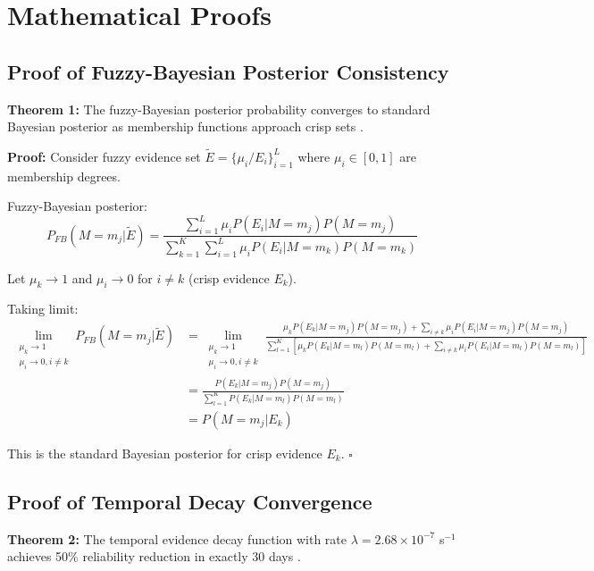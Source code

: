 
\section{Mathematical Proofs}

\subsection{Proof of Fuzzy-Bayesian Posterior Consistency}

\textbf{Theorem 1:} The fuzzy-Bayesian posterior probability converges to standard Bayesian posterior as membership functions approach crisp sets \cite{dubois1988possibility}.

\textbf{Proof:}
Consider fuzzy evidence set $\tilde{E} = \{\mu_i/E_i\}_{i=1}^L$ where $\mu_i \in [0,1]$ are membership degrees.

Fuzzy-Bayesian posterior:
\begin{equation}
P_{FB}(M = m_j | \tilde{E}) = \frac{\sum_{i=1}^L \mu_i P(E_i | M = m_j) P(M = m_j)}{\sum_{k=1}^K \sum_{i=1}^L \mu_i P(E_i | M = m_k) P(M = m_k)}
\end{equation}

Let $\mu_k \rightarrow 1$ and $\mu_i \rightarrow 0$ for $i \neq k$ (crisp evidence $E_k$).

Taking limit:
\begin{align}
\lim_{\substack{\mu_k \rightarrow 1 \\ \mu_i \rightarrow 0, i \neq k}} P_{FB}(M = m_j | \tilde{E}) &= \lim_{\substack{\mu_k \rightarrow 1 \\ \mu_i \rightarrow 0, i \neq k}} \frac{\mu_k P(E_k | M = m_j) P(M = m_j) + \sum_{i \neq k} \mu_i P(E_i | M = m_j) P(M = m_j)}{\sum_{l=1}^K \left[\mu_k P(E_k | M = m_l) P(M = m_l) + \sum_{i \neq k} \mu_i P(E_i | M = m_l) P(M = m_l)\right]} \\
&= \frac{P(E_k | M = m_j) P(M = m_j)}{\sum_{l=1}^K P(E_k | M = m_l) P(M = m_l)} \\
&= P(M = m_j | E_k)
\end{align}

This is the standard Bayesian posterior for crisp evidence $E_k$. $\square$

\subsection{Proof of Temporal Decay Convergence}

\textbf{Theorem 2:} The temporal evidence decay function with rate $\lambda = 2.68 \times 10^{-7}$ s$^{-1}$ achieves 50\% reliability reduction in exactly 30 days \cite{cox1962renewal}.

